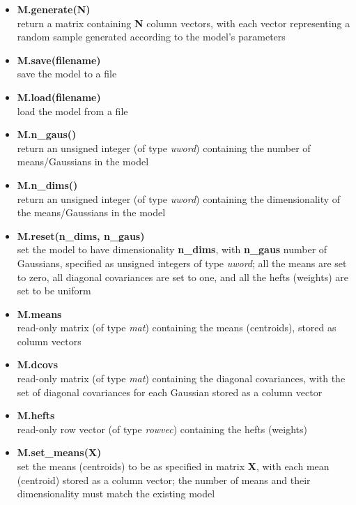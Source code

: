 \begin{itemize}
\item
{\bf M.generate(N)}\\
return a matrix containing {\bf N} column vectors, with each vector representing a random sample generated according to the model's parameters

\item
{\bf M.save(filename)}\\
save the model to a file

\item
{\bf M.load(filename)}\\
load the model from a file

\item
{\bf M.n\_gaus()}\\
return an unsigned integer (of type {\it uword}) containing the number of means/Gaussians in the model

\item
{\bf M.n\_dims()}\\
return an unsigned integer (of type {\it uword}) containing the dimensionality of the means/Gaussians in the model

\item
{\bf M.reset(n\_dims, n\_gaus)}\\
set the model to have dimensionality {\bf n\_dims}, with {\bf n\_gaus} number of Gaussians, specified as unsigned integers of type {\it uword};
all the means are set to zero, all diagonal covariances are set to one, and all the hefts (weights) are set to be uniform

\item
{\bf M.means}\\
read-only matrix (of type {\it mat}) containing the means (centroids), stored as column vectors

\item
{\bf M.dcovs}\\
read-only matrix (of type {\it mat}) containing the diagonal covariances, with the set of diagonal covariances for each Gaussian stored as a column vector

\item
{\bf M.hefts}\\
read-only row vector (of type {\it rowvec}) containing the hefts (weights)

\item
{\bf M.set\_means(X)}\\
set the means (centroids) to be as specified in matrix {\bf X}, with each mean (centroid) stored as a column vector;
the number of means and their dimensionality must match the existing model


\end{itemize}
